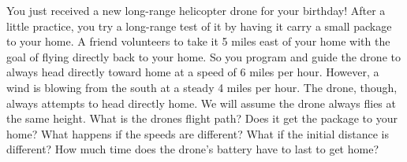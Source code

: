 \begin{problem}
     You just received a new long-range helicopter drone for your birthday! After a little
     practice, you try a long-range test of it by having it carry a small package to your
     home. A friend volunteers to take it 5 miles east of your home with the goal of
     flying directly back to your home. So you program and guide the drone to always head
     directly toward home at a speed of 6 miles per hour.  However, a wind is blowing from
     the south at a steady 4 miles per hour. The drone, though, always attempts to head
     directly home. We will assume the drone always flies at the same height. What is the
     drones flight path? Does it get the package to your home? What happens if the speeds
     are different? What if the initial distance is different? How much time does the
     drone's battery have to last to get home? \\
\end{problem}




